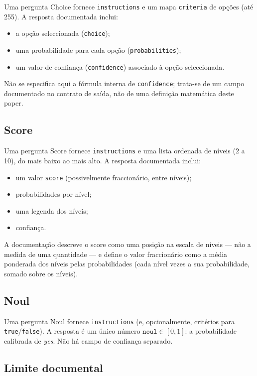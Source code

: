 \documentclass[11pt,a4paper]{article}
\begin{document}
Uma pergunta Choice fornece \texttt{instructions} e um mapa
\texttt{criteria} de opções (até 255). A resposta documentada inclui:
\begin{itemize}[leftmargin=1.5em]
\item a opção seleccionada (\texttt{choice});
\item uma probabilidade para cada opção (\texttt{probabilities});
\item um valor de confiança (\texttt{confidence}) associado à opção
seleccionada.
\end{itemize}
Não se especifica aqui a fórmula interna de \texttt{confidence}; trata-se de
um campo documentado no contrato de saída, não de uma definição matemática
deste paper.

\subsection{Score}

Uma pergunta Score fornece \texttt{instructions} e uma lista ordenada de
níveis (2 a 10), do mais baixo ao mais alto. A resposta documentada inclui:
\begin{itemize}[leftmargin=1.5em]
\item um valor \texttt{score} (possivelmente fraccionário, entre níveis);
\item probabilidades por nível;
\item uma legenda dos níveis;
\item confiança.
\end{itemize}
A documentação descreve o score como uma posição na escala de níveis --- não a
medida de uma quantidade --- e define o valor fraccionário como a média
ponderada dos níveis pelas probabilidades (cada nível vezes a sua
probabilidade, somado sobre os níveis).

\subsection{Noul}

Uma pergunta Noul fornece \texttt{instructions} (e, opcionalmente, critérios
para \texttt{true}/\texttt{false}). A resposta é um único número
\(\texttt{noul}\in[0,1]\): a probabilidade calibrada de \emph{yes}. Não há
campo de confiança separado.

\subsection{Limite documental}
\end{document}
